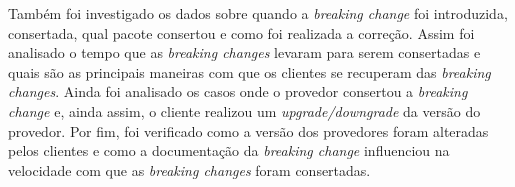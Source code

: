 Também foi investigado os dados sobre quando a \textit{breaking change} foi introduzida, consertada, qual pacote consertou e como foi realizada a correção. Assim foi analisado o tempo que as \textit{breaking changes} levaram para serem consertadas e quais são as principais maneiras com que os clientes se recuperam das \textit{breaking changes}. Ainda foi analisado os casos onde o provedor consertou a \textit{breaking change} e, ainda assim, o cliente realizou um \textit{upgrade/downgrade} da versão do provedor. Por fim, foi verificado como a versão dos provedores foram alteradas pelos clientes e como a documentação da \textit{breaking change} influenciou na velocidade com que as \textit{breaking changes} foram consertadas.
